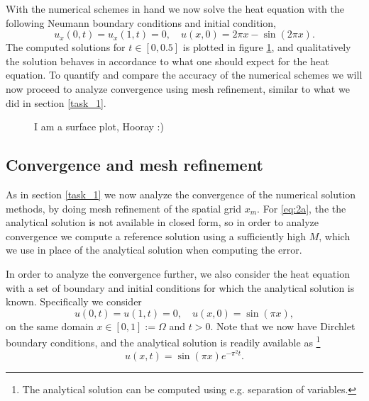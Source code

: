 With the numerical schemes in hand we now solve the heat equation with the following Neumann boundary conditions and initial condition, 
\begin{equation}
    u_x(0,t) = u_x(1,t) = 0, \quad u(x,0) = 2\pi x - \sin(2\pi x). 
    \label{eq:2a}
\end{equation}
The computed solutions for $t \in [0, 0.5]$ is plotted in figure \ref{fig:2a-surface}, 
and qualitatively the solution behaves in accordance to what one should expect for the heat equation. 
To quantify and compare the accuracy of the numerical schemes we will now proceed to analyze convergence using mesh refinement, 
similar to what we did in section \ref{task_1}. 

\begin{figure}[ht]
    \centering
    
    \caption{I am a surface plot, Hooray :)}
    \label{fig:2a-surface}
\end{figure}

\subsection{Convergence and mesh refinement}
As in section \ref{task_1} we now analyze the convergence of the numerical solution methods, 
by doing mesh refinement of the spatial grid $x_m$. 
For \eqref{eq:2a}, the the analytical solution is not available in closed form, 
so in order to analyze convergence we compute a reference solution using a sufficiently high $M$, 
which we use in place of the analytical solution when computing the error. 

In order to analyze the convergence further, 
we also consider the heat equation with a set of boundary and initial conditions for which the analytical solution is known. 
Specifically we consider 
\begin{equation}
    u(0,t) = u(1,t) = 0, \quad u(x,0) = \sin(\pi x), 
    \label{eq:2b-manufactured}
\end{equation}
on the same domain $x \in [0,1] := \Omega$ and $t > 0$. 
Note that we now have Dirchlet boundary conditions, 
and the analytical solution is readily available as 
\footnote{The analytical solution can be computed using e.g. separation of variables.}
\begin{equation}
    u(x,t) = \sin(\pi x)  e^{- \pi^2 t}.
\end{equation}

